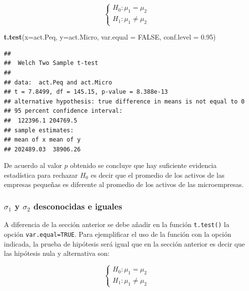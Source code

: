 \documentclass[letterpaper,]{book}
\newenvironment{Shaded}{\begin{snugshade}}{\end{snugshade}}
\newcommand{\DataTypeTok}[1]{\textcolor[rgb]{0.13,0.29,0.53}{#1}}
\newcommand{\FloatTok}[1]{\textcolor[rgb]{0.00,0.00,0.81}{#1}}
\newcommand{\KeywordTok}[1]{\textcolor[rgb]{0.13,0.29,0.53}{\textbf{#1}}}
\newcommand{\NormalTok}[1]{#1}
\newcommand{\OtherTok}[1]{\textcolor[rgb]{0.56,0.35,0.01}{#1}}
\begin{document}
\begin{equation} 
\begin{cases} 
H_0: \mu_1 = \mu_2 \\ 
H_1: \mu_1 \neq \mu_2
\end{cases} 
\end{equation}

\begin{Shaded}
\begin{Highlighting}[]
\KeywordTok{t.test}\NormalTok{(}\DataTypeTok{x=}\NormalTok{act.Peq, }\DataTypeTok{y=}\NormalTok{act.Micro, }\DataTypeTok{var.equal =} \OtherTok{FALSE}\NormalTok{,}
       \DataTypeTok{conf.level =} \FloatTok{0.95}\NormalTok{)}
\end{Highlighting}
\end{Shaded}

\begin{verbatim}
## 
##  Welch Two Sample t-test
## 
## data:  act.Peq and act.Micro
## t = 7.8499, df = 145.15, p-value = 8.388e-13
## alternative hypothesis: true difference in means is not equal to 0
## 95 percent confidence interval:
##  122396.1 204769.5
## sample estimates:
## mean of x mean of y 
## 202489.03  38906.26
\end{verbatim}

De acuerdo al valor \(p\) obtenido se concluye que hay suficiente evidencia estadística para rechazar \(H_0\) es decir que el promedio de los activos de las empresas pequeñas es diferente al promedio de los activos de las microempresas.

\hypertarget{sigma_1-y-sigma_2-desconocidas-e-iguales}{%
\subsubsection{\texorpdfstring{\(\sigma_1\) y \(\sigma_2\) desconocidas e iguales}{\textbackslash{}sigma\_1 y \textbackslash{}sigma\_2 desconocidas e iguales}}\label{sigma_1-y-sigma_2-desconocidas-e-iguales}}

A diferencia de la sección anterior se debe añadir en la función \texttt{t.test()} la opción \texttt{var.equal=TRUE}. Para ejemplificar el uso de la función con la opción indicada, la prueba de hipótesis será igual que en la sección anterior es decir que las hipótesis nula y alternativa son:

\begin{equation} 
\begin{cases} 
H_0: \mu_1 = \mu_2 \\ 
H_1: \mu_1 \neq \mu_2
\end{cases} 
\end{equation}
\end{document}
